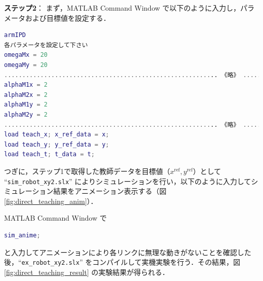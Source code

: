 \noindent
\textbf{ステップ2}： \quad
まず，MATLAB Command Window で以下のように入力し，パラメータおよび目標値を設定する．

\begin{lstlisting}[language=Matlab]
armIPD
各パラメータを設定して下さい
omegaMx = 20
omegaMy = 20
........................................................... 《略》 ...........................................................
alphaM1x = 2
alphaM2x = 2
alphaM1y = 2
alphaM2y = 2
........................................................... 《略》 ...........................................................
load teach_x; x_ref_data = x; 
load teach_y; y_ref_data = y; 
load teach_t; t_data = t;
\end{lstlisting}

つぎに，ステップ1で取得した教師データを目標値（$x^{\mathrm{ref}}, y^{\mathrm{ref}}$）として “\texttt{sim\_robot\_xy2.slx}” によりシミュレーションを行い，以下のように入力してシミュレーション結果をアニメーション表示する（図\ref{fig:direct_teaching_anim}）．

\noindent
MATLAB Command Window で

\begin{lstlisting}[language=Matlab]
sim_anime;
\end{lstlisting}

と入力してアニメーションにより各リンクに無理な動きがないことを確認した後，“\texttt{ex\_robot\_xy2.slx}” をコンパイルして実機実験を行う．その結果，図\ref{fig:direct_teaching_result} の実験結果が得られる．

